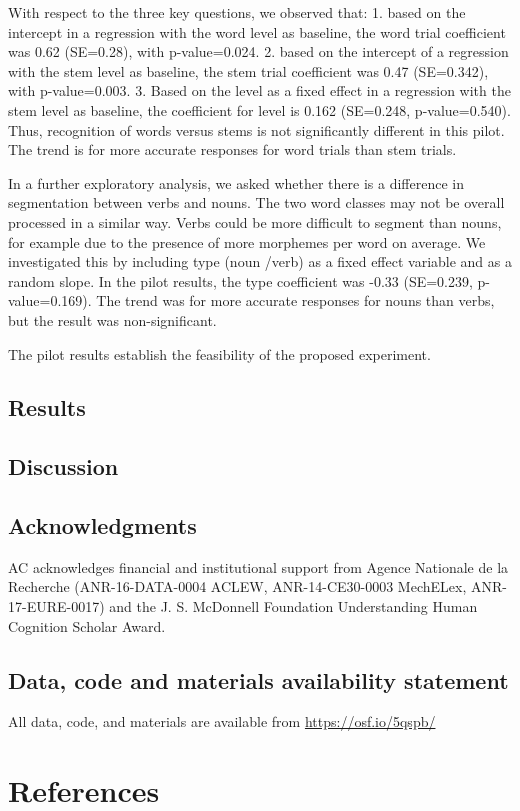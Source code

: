 \documentclass[
  american,
  ,man,floatsintext]{apa6}
\begin{document}
With respect to the three key questions, we observed that: 1. based on the intercept in a regression with the word level as baseline, the word trial coefficient was 0.62 (SE=0.28), with p-value=0.024. 2. based on the intercept of a regression with the stem level as baseline, the stem trial coefficient was 0.47 (SE=0.342), with p-value=0.003. 3. Based on the level as a fixed effect in a regression with the stem level as baseline, the coefficient for level is 0.162 (SE=0.248, p-value=0.540). Thus, recognition of words versus stems is not significantly different in this pilot. The trend is for more accurate responses for word trials than stem trials.

In a further exploratory analysis, we asked whether there is a difference in segmentation between verbs and nouns. The two word classes may not be overall processed in a similar way. Verbs could be more difficult to segment than nouns, for example due to the presence of more morphemes per word on average. We investigated this by including type (noun /verb) as a fixed effect variable and as a random slope. In the pilot results, the type coefficient was -0.33 (SE=0.239, p-value=0.169). The trend was for more accurate responses for nouns than verbs, but the result was non-significant.

The pilot results establish the feasibility of the proposed experiment.

\hypertarget{results}{%
\subsection{Results}\label{results}}

\hypertarget{discussion}{%
\subsection{Discussion}\label{discussion}}

\newpage

\hypertarget{acknowledgments}{%
\subsection{Acknowledgments}\label{acknowledgments}}

AC acknowledges financial and institutional support from Agence Nationale de la Recherche (ANR-16-DATA-0004 ACLEW, ANR-14-CE30-0003 MechELex, ANR-17-EURE-0017) and the J. S. McDonnell Foundation Understanding Human Cognition Scholar Award.

\hypertarget{data-code-and-materials-availability-statement}{%
\subsection{Data, code and materials availability statement}\label{data-code-and-materials-availability-statement}}

All data, code, and materials are available from \url{https://osf.io/5qspb/}

\hypertarget{references}{%
\section{References}\label{references}}

\setlength{\parindent}{-0.5in}
\setlength{\leftskip}{0.5in}
\end{document}
